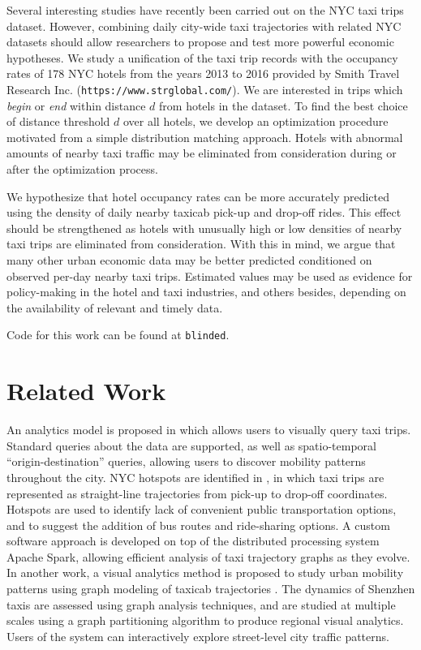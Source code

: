 \documentclass[useAMS, referee, usenatbib]{biom}
\begin{document}
Several interesting studies have recently been carried out on the NYC taxi trips dataset. However, combining daily city-wide taxi trajectories with related NYC datasets should allow researchers to propose and test more powerful economic hypotheses. We study a unification of the taxi trip records with the occupancy rates of 178 NYC hotels from the years 2013 to 2016 provided by Smith Travel Research Inc. (\texttt{https://www.strglobal.com/}). We are interested in trips which \textit{begin} or \textit{end} within distance $d$ from hotels in the dataset. To find the best choice of distance threshold $d$ over all hotels, we develop an optimization procedure motivated from a simple distribution matching approach. Hotels with abnormal amounts of nearby taxi traffic may be eliminated from consideration during or after the optimization process.

We hypothesize that hotel occupancy rates can be more accurately predicted using the density of daily nearby taxicab pick-up and drop-off rides. This effect should be strengthened as hotels with unusually high or low densities of nearby taxi trips are eliminated from consideration. With this in mind, we argue that many other urban economic data may be better predicted conditioned on observed per-day nearby taxi trips. Estimated values may be used as evidence for policy-making in the hotel and taxi industries, and others besides, depending on the availability of relevant and timely data.

Code for this work can be found at \texttt{blinded}.



\section{Related Work}
\label{s:related}

An analytics model is proposed in \citet{Ferreira2013VisualEO} which allows users to visually query taxi trips. Standard queries about the data are supported, as well as spatio-temporal ``origin-destination'' queries, allowing users to discover mobility patterns throughout the city. NYC hotspots are identified in \citet{Stoyanovich2017ZoomingIO}, in which taxi trips are represented as straight-line trajectories from pick-up to drop-off coordinates. Hotspots are used to identify lack of convenient public transportation options, and to suggest the addition of bus routes and ride-sharing options. A custom software approach is developed on top of the distributed processing system Apache Spark, allowing efficient analysis of taxi trajectory graphs as they evolve. In another work, a visual analytics method is proposed to study urban mobility patterns using graph modeling of taxicab trajectories \citep{Huang2016TrajGraphAG}. The dynamics of Shenzhen taxis are assessed using graph analysis techniques, and are studied at multiple scales using a graph partitioning algorithm to produce regional visual analytics. Users of the system can interactively explore street-level city traffic patterns. 
\end{document}
